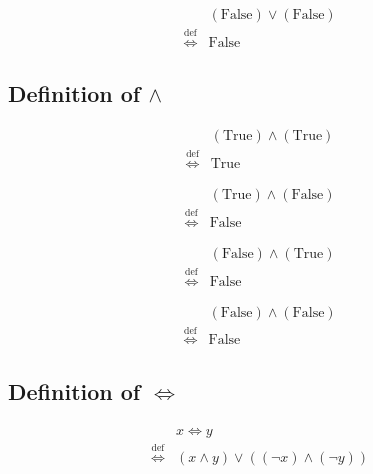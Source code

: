 \begin{defn}
\label{Definition:lor_False_False}
\begin{align*}
& (\text{False}) \lor (\text{False}) \\
\overset{\operatorname{def}}{\iff} & \text{False}
\end{align*}
\end{defn}

\subsection{Definition of $\land$}
\begin{defn}
\label{Definition:land_True_True}
\begin{align*}
& (\text{True}) \land (\text{True}) \\
\overset{\operatorname{def}}{\iff} & \text{True}
\end{align*}
\end{defn}

\begin{defn}
\label{Definition:land_True_False}
\begin{align*}
& (\text{True}) \land (\text{False}) \\
\overset{\operatorname{def}}{\iff} & \text{False}
\end{align*}
\end{defn}

\begin{defn}
\label{Definition:land_False_True}
\begin{align*}
& (\text{False}) \land (\text{True}) \\
\overset{\operatorname{def}}{\iff} & \text{False}
\end{align*}
\end{defn}

\begin{defn}
\label{Definition:land_False_False}
\begin{align*}
& (\text{False}) \land (\text{False}) \\
\overset{\operatorname{def}}{\iff} & \text{False}
\end{align*}
\end{defn}

\subsection{Definition of $\iff$}
\begin{defn}
\label{Definition:iff}
\begin{align*}
& x \iff y \\
\overset{\operatorname{def}}{\iff} & (x \land y) \lor ((\lnot x) \land (\lnot y))
\end{align*}
\end{defn}

